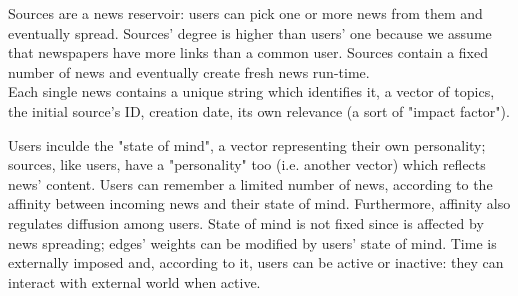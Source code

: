 Sources are a news reservoir: users can pick one or more news from them
and eventually spread. Sources' degree is higher than users' one
because we assume that newspapers have more links than a common user. Sources
contain a fixed number of news and eventually create fresh news run-time.\\
Each single news contains a unique string which identifies it, a vector
of topics, the initial source's ID, creation date, its own relevance
(a sort of "impact factor").

Users inculde the "state of mind", a vector representing their own personality;
sources, like users, have a "personality" too (i.e. another vector)
which reflects news' content.
Users can remember a limited number of news, according to the affinity
between incoming news and their state of mind.
Furthermore, affinity also regulates diffusion among users.
State of mind is not fixed since is affected by news spreading;
edges' weights can be modified by users' state of mind.
Time is externally imposed and, according to it, users can be active
or inactive: they can interact with external world when active.
